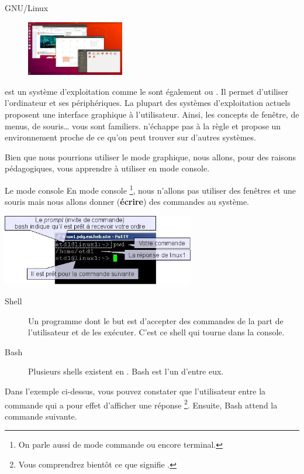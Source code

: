 \documentclass[a4paper,11pt]{style-esi/td}
\begin{document}
		\begin{theorie}{GNU/Linux}
			\begin{figure} 
				\vspace{-1em}
				\flushright
				\includegraphics[width=0.38\textwidth]{images/ubuntu}
				\caption{}
				\vspace{-1em}
			\end{figure} 
			 est un système d'exploitation comme le sont 
			également  ou . 
			Il permet d'utiliser l'ordinateur et ses périphériques. 
			La plupart des systèmes d'exploitation actuels proposent 
			une interface graphique à l'utilisateur. 
			Ainsi, les concepts de fenêtre, de menus, de souris\dots{} vous sont familiers. 
			 n'échappe pas à la règle et propose un environnement 
			proche de ce qu'on peut trouver sur d'autres systèmes.
		\end{theorie}

		Bien que nous pourrions utiliser le mode graphique, 
		nous allons, pour des raisons pédagogiques, 
		vous apprendre à utiliser  en mode console.

		\begin{theorie}{Le mode console}
			En mode console%
			\footnote{%
				On parle aussi de mode \og{}commande\fg{} ou encore \og{}terminal\fg{}.
			}, 
			nous n'allons pas utiliser des fenêtres et une souris 
			mais nous allons donner (\textbf{écrire}) des commandes au système.
			
			\medskip
			\begin{center}
			\includegraphics[width=0.63\textwidth]{images/console}
			\end{center}
			\begin{description}
			\item[Shell] 
				Un programme dont le but 
				est d'accepter des commandes de la part de l'utilisateur 
				et de les exécuter. 
				C'est ce shell qui tourne dans la console.
			\item[Bash] 
				Plusieurs shells existent en . Bash est l'un d'entre eux.
			\end{description} 
			Dans l'exemple ci-dessus, 
			vous pouvez constater que l'utilisateur entre la commande   
			qui a pour effet d'afficher une réponse%
			\footnote{%
				Vous comprendrez bientôt ce que signifie .
			}. 
			Ensuite, Bash attend la commande suivante.
		\end{theorie}
\end{document}
